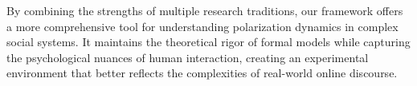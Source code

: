 By combining the strengths of multiple research traditions, our framework offers a more comprehensive tool for understanding polarization dynamics in complex social systems. It maintains the theoretical rigor of formal models while capturing the psychological nuances of human interaction, creating an experimental environment that better reflects the complexities of real-world online discourse.



